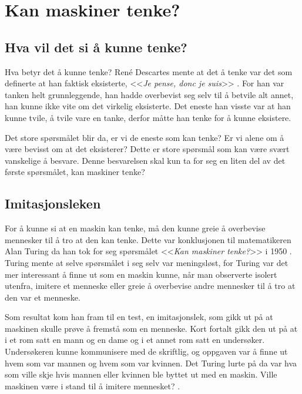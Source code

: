 \section{Kan maskiner tenke?}

\subsection{Hva vil det si å kunne tenke?}

Hva betyr det å kunne tenke?
René Descartes mente at det å tenke var det som definerte at han faktisk eksisterte, <<\textit{Je pense, donc je suis}>> \autocite[30]{Descartes1637}.
For han var tanken helt grunnleggende, 
han hadde overbevist seg selv til å betvile alt annet, han kunne ikke vite om det virkelig eksisterte. 
Det eneste han visste var at han kunne tvile, å tvile vare en tanke, derfor måtte han tenke for å kunne eksistere.

Det store spørsmålet blir da, er vi de eneste som kan tenke? 
Er vi alene om å være bevisst om at det eksisterer? 
Dette er store spørsmål som kan være svært vanskelige å besvare. 
Denne besvarelsen skal kun ta for seg en liten del av det første spørsmålet, 
kan maskiner tenke?

\subsection{Imitasjonsleken}

For å kunne si at en maskin kan tenke, må den kunne greie å overbevise mennesker til å tro at den kan tenke. Dette var konklusjonen til matematikeren Alan Turing da han tok for seg spørsmålet <<\textit{Kan maskiner tenke?}>> i 1950 \autocite{Kiran2013}. 
Turing mente at selve spørsmålet i seg selv var meningsløst, for Turing var det mer interessant å finne ut som en maskin kunne, når man observerte isolert utenfra, imitere et menneske eller greie å overbevise andre mennesker til å tro at den var et menneske.

Som resultat kom han fram til en test, en imitasjonslek, som gikk ut på at maskinen skulle prøve å fremstå som en menneske.
Kort fortalt gikk den ut på at i et rom satt en mann og en dame og i et annet rom satt en undersøker. 
Undersøkeren kunne kommunisere med de skriftlig, og oppgaven var å finne ut hvem som var mannen og hvem som var kvinnen.
Det Turing lurte på da var hva som ville skje hvis mannen eller kvinnen ble byttet ut med en maskin. 
Ville maskinen være i stand til å imitere mennesket?
\autocite[433-434]{Turing1950}.

